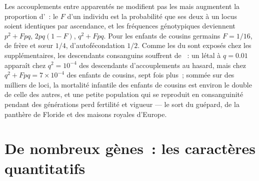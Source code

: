 \begin{proposition}[La consanguinité]\label{prop:b2:population-genetics:inbreeding}
Les accouplements entre apparentés ne modifient pas les  mais augmentent la proportion d'~: le
\emph{} $F$ d'un individu est la probabilité
que ses deux  à un locus soient identiques par ascendance, et les
fréquences génotypiques deviennent $p^{2} + Fpq$, $2pq(1 - F)$, $q^{2} + Fpq$. Pour
les enfants de cousins germains $F = 1/16$, de frère et sœur $1/4$,
d'autofécondation $1/2$. Comme les   du  sont exposés chez les  supplémentaires, les
descendants consanguins souffrent de \emph{}~:
un  létal à $q = 0.01$
apparaît chez $q^{2} = 10^{-4}$ des descendants d'accouplements au hasard,
mais chez
$q^{2} + Fpq = 7\times 10^{-4}$ des enfants de cousins, sept fois plus~;
sommée sur des milliers de loci, la mortalité infantile des enfants de
cousins est environ le double de celle des autres, et une petite
population qui se reproduit en consanguinité pendant des générations perd
fertilité et vigueur --- le sort du guépard, de la panthère de Floride et
des maisons royales d'Europe.
\end{proposition}

\section{De nombreux gènes~: les caractères quantitatifs}

